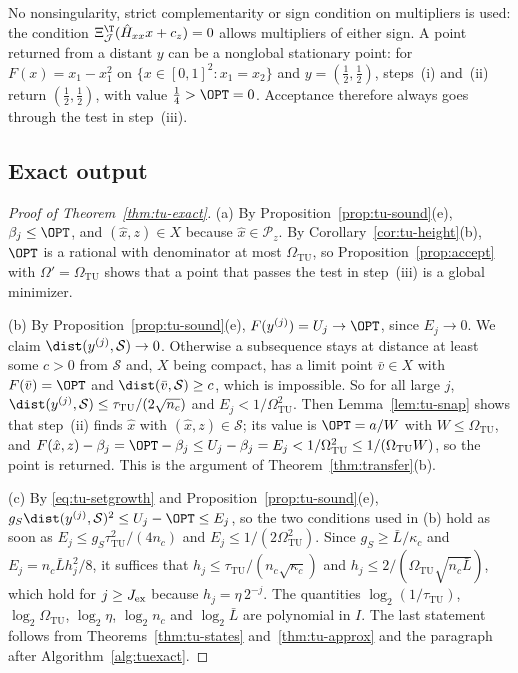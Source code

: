 No nonsingularity, strict complementarity or sign condition on multipliers is
used: the condition $\Xi_{\mathcal J}^{\T}(\hat H_{xx}x+c_z)=0$ allows
multipliers of either sign. A point returned from a distant $y$ can be a
nonglobal stationary point: for $F(x)=x_1-x_1^2$ on
$\{x\in[0,1]^2:x_1=x_2\}$ and $y=(\frac12,\frac12)$, steps~(i) and~(ii)
return $(\frac12,\frac12)$, with value $\frac14>\OPT=0$. Acceptance therefore
always goes through the test in step~(iii).

\subsection{Exact output}\label{app:tu-exact-proof}

\begin{proof}[Proof of Theorem~\ref{thm:tu-exact}]
(a) By Proposition~\ref{prop:tu-sound}(e), $\beta_j\le\OPT$, and
$(\hat x,z)\in X$ because $\hat x\in\mathcal P_z$. By
Corollary~\ref{cor:tu-height}(b), $\OPT$ is a rational with denominator at most
$\Omega_{\mathrm{TU}}$, so Proposition~\ref{prop:accept} with
$\Omega'=\Omega_{\mathrm{TU}}$ shows that a point that passes the test in
step~(iii) is a global minimizer.

(b) By Proposition~\ref{prop:tu-sound}(e), $F(y^{(j)})=U_j\to\OPT$, since
$E_j\to0$. We claim $\dist(y^{(j)},\mathcal S)\to0$. Otherwise a subsequence
stays at distance at least some $c>0$ from $\mathcal S$ and, $X$ being compact,
has a limit point $\bar v\in X$ with $F(\bar v)=\OPT$ and
$\dist(\bar v,\mathcal S)\ge c$, which is impossible. So for all large $j$,
$\dist(y^{(j)},\mathcal S)\le\tau_{\mathrm{TU}}/(2\sqrt{n_c})$ and
$E_j<1/\Omega_{\mathrm{TU}}^2$. Then Lemma~\ref{lem:tu-snap} shows that
step~(ii) finds $\hat x$ with $(\hat x,z)\in\mathcal S$; its value is
$\OPT=a/W$ with $W\le\Omega_{\mathrm{TU}}$, and
$F(\hat x,z)-\beta_j=\OPT-\beta_j\le U_j-\beta_j=E_j<1/\Omega_{\mathrm{TU}}^2
\le1/(\Omega_{\mathrm{TU}}W)$, so the point is returned. This is the argument
of Theorem~\ref{thm:transfer}(b).

(c) By \eqref{eq:tu-setgrowth} and Proposition~\ref{prop:tu-sound}(e),
$g_S\dist(y^{(j)},\mathcal S)^2\le U_j-\OPT\le E_j$, so the two conditions used
in (b) hold as soon as $E_j\le g_S\tau_{\mathrm{TU}}^2/(4n_c)$ and
$E_j\le1/(2\Omega_{\mathrm{TU}}^2)$. Since $g_S\ge\bar L/\kappa_c$ and
$E_j=n_c\bar Lh_j^2/8$, it suffices that
$h_j\le\tau_{\mathrm{TU}}/(n_c\sqrt{\kappa_c})$ and
$h_j\le2/(\Omega_{\mathrm{TU}}\sqrt{n_c\bar L})$, which hold for
$j\ge J_{\rm ex}$ because $h_j=\eta\,2^{-j}$. The quantities
$\log_2(1/\tau_{\mathrm{TU}})$, $\log_2\Omega_{\mathrm{TU}}$, $\log_2\eta$,
$\log_2n_c$ and $\log_2\bar L$ are polynomial in $I$. The last statement
follows from Theorems~\ref{thm:tu-states} and~\ref{thm:tu-approx} and the
paragraph after Algorithm~\ref{alg:tuexact}.
\end{proof}

